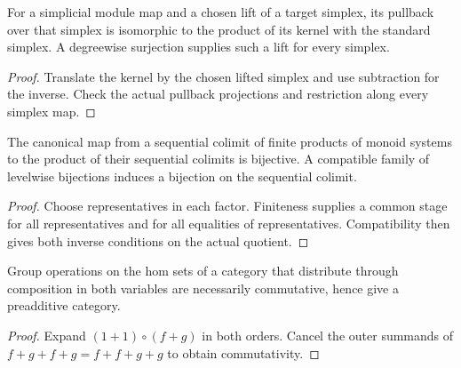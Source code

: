 \begin{proposition}
  \label{prop:principal-simplex-trivialization}
  \leanok
  For a simplicial module map and a chosen lift of a target simplex, its pullback over that simplex is isomorphic to the product of its kernel with the standard simplex. A degreewise surjection supplies such a lift for every simplex.
\end{proposition}
\begin{proof}
  Translate the kernel by the chosen lifted simplex and use subtraction for the inverse. Check the actual pullback projections and restriction along every simplex map.
  \leanok
\end{proof}

\begin{proposition}
  \label{prop:sequential-colimit-finite-products}
  \leanok
  The canonical map from a sequential colimit of finite products of monoid systems to the product of their sequential colimits is bijective. A compatible family of levelwise bijections induces a bijection on the sequential colimit.
\end{proposition}
\begin{proof}
  Choose representatives in each factor. Finiteness supplies a common stage for all representatives and for all equalities of representatives. Compatibility then gives both inverse conditions on the actual quotient.
  \leanok
\end{proof}

\begin{proposition}
  \label{prop:bilinear-hom-groups}
  \leanok
  Group operations on the hom sets of a category that distribute through composition in both variables are necessarily commutative, hence give a preadditive category.
\end{proposition}
\begin{proof}
  Expand $(1+1)\circ(f+g)$ in both orders. Cancel the outer summands of $f+g+f+g=f+f+g+g$ to obtain commutativity.
  \leanok
\end{proof}

